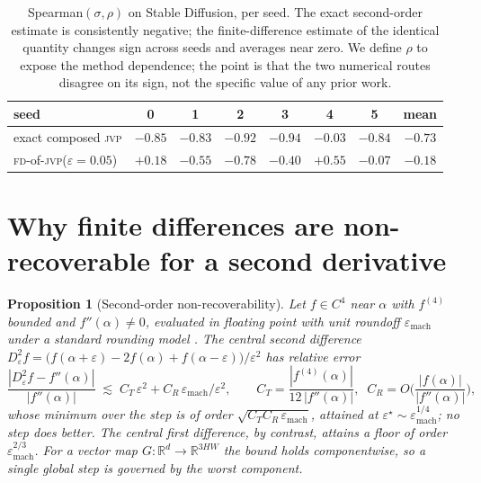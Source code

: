 \documentclass[10pt]{article} %
\newtheorem{proposition}{Proposition}
\newcommand{\R}{\mathbb{R}}
\newcommand{\jvp}{\textsc{jvp}}
\newcommand{\fd}{\textsc{fd}}
\newcommand{\eps}{\varepsilon}
\begin{document}
\begin{table}[h]\centering
\begin{tabular}{lccccccc}
\toprule
seed & 0 & 1 & 2 & 3 & 4 & 5 & mean \\
\midrule
exact composed \jvp & $-0.85$ & $-0.83$ & $-0.92$ & $-0.94$ & $-0.03$ & $-0.84$ & $-0.73$ \\
\fd-of-\jvp ($\eps{=}0.05$) & $+0.18$ & $-0.55$ & $-0.78$ & $-0.40$ & $+0.55$ & $-0.07$ & $-0.18$ \\
\bottomrule
\end{tabular}
\caption{Spearman$(\sigma,\rho)$ on Stable Diffusion, per seed. The exact
second-order estimate is consistently negative; the finite-difference estimate of
the identical quantity changes sign across seeds and averages near zero. We define
$\rho$ to expose the method dependence; the point is that the two numerical routes
disagree on its sign, not the specific value of any prior work.}
\label{tab:flip}
\end{table}

\section{Why finite differences are non-recoverable for a second derivative}
\label{sec:fd}
\begin{proposition}[Second-order non-recoverability]
\label{prop:floor}
Let $f\in C^4$ near $\alpha$ with $f^{(4)}$ bounded and $f''(\alpha)\neq0$,
evaluated in floating point with unit roundoff $\eps_{\mathrm{mach}}$ under a
standard rounding model \citep{higham2002}. The central second difference
$D^2_\eps f=\big(f(\alpha+\eps)-2f(\alpha)+f(\alpha-\eps)\big)/\eps^2$ has relative
error
\[
\frac{|D^2_\eps f-f''(\alpha)|}{|f''(\alpha)|}
\;\lesssim\; C_T\,\eps^2 + C_R\,\eps_{\mathrm{mach}}/\eps^2,
\qquad C_T=\frac{|f^{(4)}(\alpha)|}{12\,|f''(\alpha)|},\;\;
C_R=O\!\Big(\frac{|f(\alpha)|}{|f''(\alpha)|}\Big),
\]
whose minimum over the step is of order $\sqrt{C_T C_R\,\eps_{\mathrm{mach}}}$,
attained at $\eps^\star\sim\eps_{\mathrm{mach}}^{1/4}$; no step does better. The
central first difference, by contrast, attains a floor of order
$\eps_{\mathrm{mach}}^{2/3}$. For a vector map $G:\R^{d}\to\R^{3HW}$ the bound holds
componentwise, so a single global step is governed by the worst component.
\end{proposition}
\end{document}
